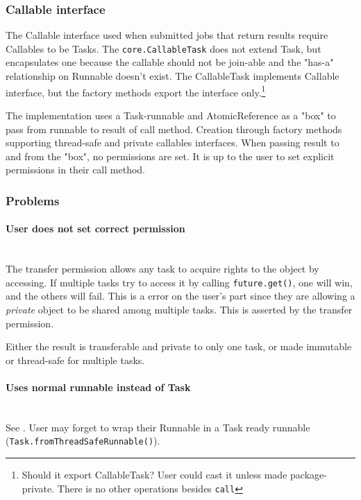 \documentclass[11pt]{article}
\begin{document}
    \subsubsection{Callable interface}
    The Callable interface used when submitted jobs that return results require Callables to be Tasks.
    The \lstinline{core.CallableTask} does not extend Task, but encapsulates one because the callable
    should not be join-able and the "has-a" relationship on Runnable doesn't exist. The CallableTask
    implements Callable interface, but the factory methods export the interface only.\footnote{Should it export
    CallableTask? User could cast it unless made package-private. There is no other operations besides \lstinline{call}}

    The implementation uses a Task-runnable and AtomicReference as a "box" to pass from runnable to
    result of call method. Creation through factory methods supporting thread-safe and private callables
    interfaces. When passing result to and from the "box", no permissions are set. It is up to the user
    to set explicit permissions in their call method.

    \subsubsection{Problems}
    \paragraph{User does not set correct permission}\mbox{} \\
    The transfer permission allows any task to acquire rights to the object by accessing. If multiple
    tasks try to access it by calling \lstinline{future.get()}, one will win, and the others will fail.
    This is a error on the user's part since they are allowing a \textit{private} object to be shared
    among multiple tasks. This is asserted by the transfer permission.

    Either the result is transferable and private to only one task, or made immutable or thread-safe for
    multiple tasks.

    \paragraph{Uses normal runnable instead of Task}\mbox{} \\
    See . User may forget to wrap their Runnable in a Task ready
    runnable (\lstinline{Task.fromThreadSafeRunnable()}).
\end{document}
